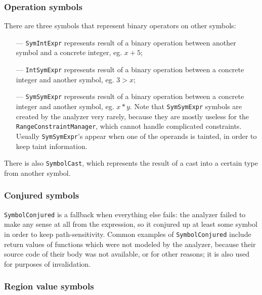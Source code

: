 \documentclass[a4paper,12pt]{article}
\begin{document}
\subsubsection{Operation symbols}

There are three symbols that represent binary operators on other symbols:
\begin{itemize}
 \item[---]\lstinline|SymIntExpr| represents result of a binary operation between another symbol and a concrete integer, eg. $x + 5$;
\item[---]\lstinline|IntSymExpr| represents result of a binary operation between a concrete integer and another symbol, eg. $3 > x$;
\item[---]\lstinline|SymSymExpr| represents result of a binary operation between a concrete integer and another symbol, eg. $x * y$. Note that \lstinline|SymSymExpr| symbols are created by the analyzer very rarely, because they are mostly useless for the \lstinline|RangeConstraintManager|, which cannot handle complicated constraints. Usually \lstinline|SymSymExpr|'s appear when one of the operands is tainted, in order to keep taint information.
\end{itemize}

There is also \lstinline|SymbolCast|, which represents the result of a cast into a certain type from another symbol.

\subsubsection{Conjured symbols}\label{subsubsec:SymbolConjured}

\lstinline|SymbolConjured| is a fallback when everything else fails: the analyzer failed to make any sense at all from the expression, so it conjured up at least some symbol in order to keep path-sensitivity. Common examples of \lstinline|SymbolConjured| include return values of functions which were not modeled by the analyzer, because their source code of their body was not available, or for other reasons; it is also used for purposes of invalidation.

\subsubsection{Region value symbols}
\end{document}
